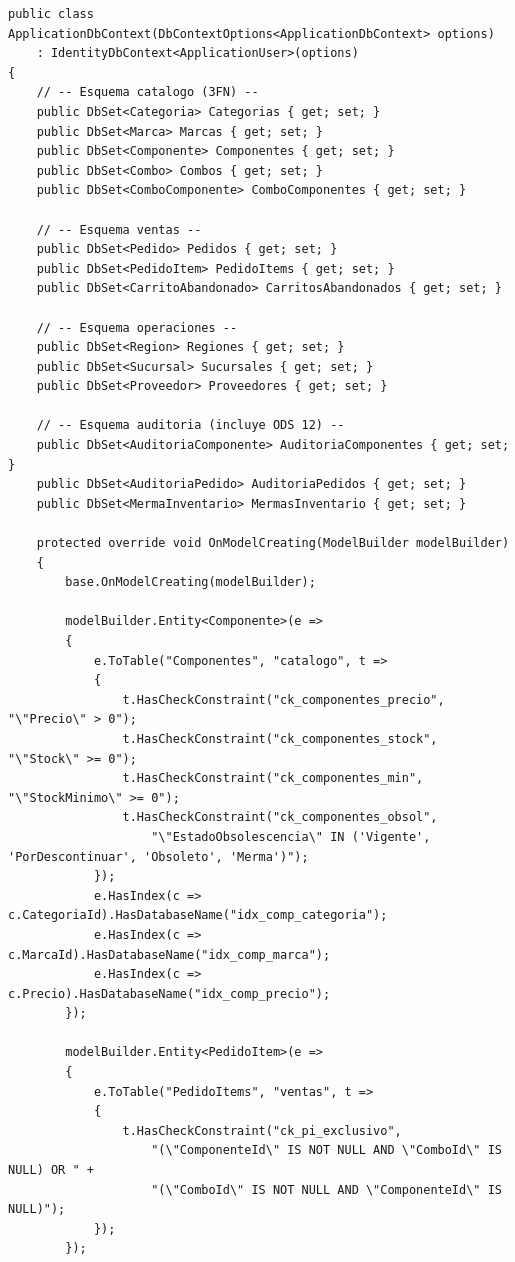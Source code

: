 \begin{lstlisting}[language={[Sharp]C}, caption={Extracto real de ApplicationDbContext.cs con mapeo multiesquema y restricciones}, label=lst:efcore]
public class ApplicationDbContext(DbContextOptions<ApplicationDbContext> options)
    : IdentityDbContext<ApplicationUser>(options)
{
    // -- Esquema catalogo (3FN) --
    public DbSet<Categoria> Categorias { get; set; }
    public DbSet<Marca> Marcas { get; set; }
    public DbSet<Componente> Componentes { get; set; }
    public DbSet<Combo> Combos { get; set; }
    public DbSet<ComboComponente> ComboComponentes { get; set; }

    // -- Esquema ventas --
    public DbSet<Pedido> Pedidos { get; set; }
    public DbSet<PedidoItem> PedidoItems { get; set; }
    public DbSet<CarritoAbandonado> CarritosAbandonados { get; set; }

    // -- Esquema operaciones --
    public DbSet<Region> Regiones { get; set; }
    public DbSet<Sucursal> Sucursales { get; set; }
    public DbSet<Proveedor> Proveedores { get; set; }

    // -- Esquema auditoria (incluye ODS 12) --
    public DbSet<AuditoriaComponente> AuditoriaComponentes { get; set; }
    public DbSet<AuditoriaPedido> AuditoriaPedidos { get; set; }
    public DbSet<MermaInventario> MermasInventario { get; set; }

    protected override void OnModelCreating(ModelBuilder modelBuilder)
    {
        base.OnModelCreating(modelBuilder);

        modelBuilder.Entity<Componente>(e =>
        {
            e.ToTable("Componentes", "catalogo", t =>
            {
                t.HasCheckConstraint("ck_componentes_precio", "\"Precio\" > 0");
                t.HasCheckConstraint("ck_componentes_stock", "\"Stock\" >= 0");
                t.HasCheckConstraint("ck_componentes_min", "\"StockMinimo\" >= 0");
                t.HasCheckConstraint("ck_componentes_obsol",
                    "\"EstadoObsolescencia\" IN ('Vigente', 'PorDescontinuar', 'Obsoleto', 'Merma')");
            });
            e.HasIndex(c => c.CategoriaId).HasDatabaseName("idx_comp_categoria");
            e.HasIndex(c => c.MarcaId).HasDatabaseName("idx_comp_marca");
            e.HasIndex(c => c.Precio).HasDatabaseName("idx_comp_precio");
        });

        modelBuilder.Entity<PedidoItem>(e =>
        {
            e.ToTable("PedidoItems", "ventas", t =>
            {
                t.HasCheckConstraint("ck_pi_exclusivo",
                    "(\"ComponenteId\" IS NOT NULL AND \"ComboId\" IS NULL) OR " +
                    "(\"ComboId\" IS NOT NULL AND \"ComponenteId\" IS NULL)");
            });
        });


\end{lstlisting}
